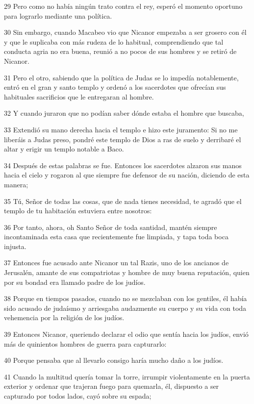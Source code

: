 \par 29 Pero como no había ningún trato contra el rey, esperó el momento oportuno para lograrlo mediante una política.
\par 30 Sin embargo, cuando Macabeo vio que Nicanor empezaba a ser grosero con él y que le suplicaba con más rudeza de lo habitual, comprendiendo que tal conducta agria no era buena, reunió a no pocos de sus hombres y se retiró de Nicanor.
\par 31 Pero el otro, sabiendo que la política de Judas se lo impedía notablemente, entró en el gran y santo templo y ordenó a los sacerdotes que ofrecían sus habituales sacrificios que le entregaran al hombre.
\par 32 Y cuando juraron que no podían saber dónde estaba el hombre que buscaba,
\par 33 Extendió su mano derecha hacia el templo e hizo este juramento: Si no me liberáis a Judas preso, pondré este templo de Dios a ras de suelo y derribaré el altar y erigir un templo notable a Baco.
\par 34 Después de estas palabras se fue. Entonces los sacerdotes alzaron sus manos hacia el cielo y rogaron al que siempre fue defensor de su nación, diciendo de esta manera;
\par 35 Tú, Señor de todas las cosas, que de nada tienes necesidad, te agradó que el templo de tu habitación estuviera entre nosotros:
\par 36 Por tanto, ahora, oh Santo Señor de toda santidad, mantén siempre incontaminada esta casa que recientemente fue limpiada, y tapa toda boca injusta.
\par 37 Entonces fue acusado ante Nicanor un tal Razis, uno de los ancianos de Jerusalén, amante de sus compatriotas y hombre de muy buena reputación, quien por su bondad era llamado padre de los judíos.
\par 38 Porque en tiempos pasados, cuando no se mezclaban con los gentiles, él había sido acusado de judaísmo y arriesgaba audazmente su cuerpo y su vida con toda vehemencia por la religión de los judíos.
\par 39 Entonces Nicanor, queriendo declarar el odio que sentía hacia los judíos, envió más de quinientos hombres de guerra para capturarlo:
\par 40 Porque pensaba que al llevarlo consigo haría mucho daño a los judíos.
\par 41 Cuando la multitud quería tomar la torre, irrumpir violentamente en la puerta exterior y ordenar que trajeran fuego para quemarla, él, dispuesto a ser capturado por todos lados, cayó sobre su espada;
